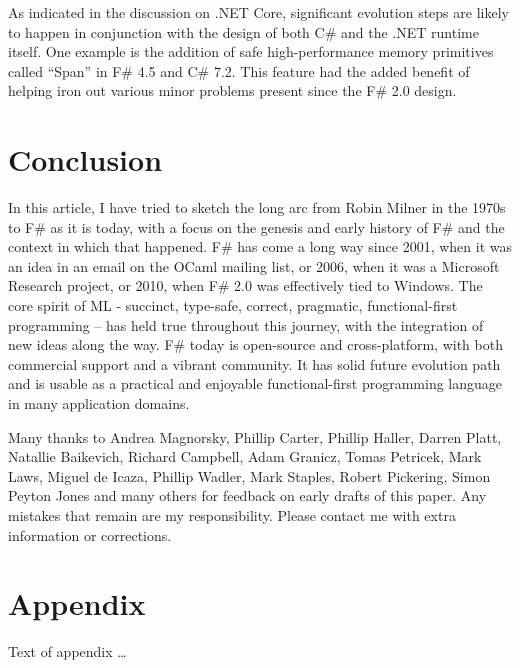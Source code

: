 \documentclass[acmsmall,review]{acmart}\settopmatter{printfolios=true,printccs=false,printacmref=false}
\begin{document}
As indicated in the discussion on .NET Core, significant evolution steps are likely to happen in conjunction with the design of both C\# and the .NET runtime itself.  One example is the addition of safe high-performance memory primitives called “Span” in F\# 4.5 and C\# 7.2.  This feature had the added benefit of helping iron out various minor problems present since the F\# 2.0 design.

\section*{Conclusion}

In this article, I have tried to sketch the long arc from Robin Milner in the 1970s to F\# as it is today, with a focus on the genesis and early history of F\# and the context in which that happened. F\# has come a long way since 2001, when it was an idea in an email on the OCaml mailing list, or 2006, when it was a Microsoft Research project, or 2010, when F\# 2.0 was effectively tied to Windows. The core spirit of ML - succinct, type-safe, correct, pragmatic, functional-first programming – has held true throughout this journey, with the integration of new ideas along the way.  F\# today is open-source and cross-platform, with both commercial support and a vibrant community. It has solid future evolution path and is usable as a practical and enjoyable functional-first programming language in many application domains.  





\begin{acks}                            %

Many thanks to Andrea Magnorsky, Phillip Carter, Phillip Haller, Darren Platt, Natallie Baikevich, Richard Campbell, Adam Granicz, Tomas Petricek, Mark Laws, Miguel de Icaza, Phillip Wadler, Mark Staples, Robert Pickering, Simon Peyton Jones and many others for feedback on early drafts of this paper.  Any mistakes that remain are my responsibility. Please contact me with extra information or corrections.

\end{acks}


%


\appendix
\section*{Appendix}

Text of appendix \ldots
\end{document}
